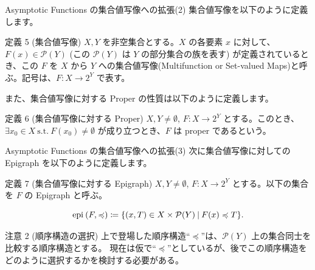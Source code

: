 \documentclass[aspectratio=169, dvipdfmx, 11pt]{beamer} %
\newcommand{\Epigraph}[1]{\text{epi\:${#1}$}} %
\newcommand{\SuchThat}{\:\text{s.t.}\:}
\newcommand{\SetForm}[2]{
  \{{#1}\:|\:{#2}\}
}
\begin{document}
\begin{frame}{Asymptotic Functions の集合値写像への拡張(2)}
  集合値写像を以下のように定義します。

  \begin{block}{定義 5 (集合値写像) \cite{ref1}}
    $X, Y$ を非空集合とする。$X$ の各要素 $x$ に対して、$F(x) \in \mathcal{P}(Y)$ (この $\mathcal{P}(Y)$ は $Y$ の部分集合の族を表す) が定義されているとき、この $F$ を $X$ から $Y$ への集合値写像(Multifunction or Set-valued Maps)と呼ぶ。記号は、$F: X \rightarrow 2^Y$ で表す。
  \end{block}

  また、集合値写像に対する Proper の性質は以下のように定義します。

  \begin{block}{定義 6 (集合値写像に対する Proper) \cite{ref2}}
    $X, Y \ne \emptyset$, $F: X \rightarrow 2^Y$ とする。このとき、$\exists x_0 \in X \SuchThat F(x_0) \ne \emptyset$ が成り立つとき、$F$ は proper であるという。
  \end{block}
\end{frame}

\begin{frame}{Asymptotic Functions の集合値写像への拡張(3)}
  次に集合値写像に対しての Epigraph を以下のように定義します。

  \begin{block}{定義 7 (集合値写像に対する Epigraph) \cite{ref1}}
    $X, Y \ne \emptyset$, $F: X \rightarrow 2^Y$ とする。以下の集合を $F$ の Epigraph と呼ぶ。

    \begin{equation}
      \Epigraph{(F, \preccurlyeq )} \coloneqq \SetForm{(x,T) \in X \times \mathcal{P}(Y)}{F(x) \preccurlyeq T}. \notag
    \end{equation}
  \end{block}

  \begin{alertblock}{注意 2 (順序構造の選択)}
    上で登場した順序構造``$\preccurlyeq$''は、$\mathcal{P}(Y)$ 上の集合同士を比較する順序構造とする。
    現在は仮で``$\preccurlyeq$''としているが、後でこの順序構造をどのように選択するかを検討する必要がある。
  \end{alertblock}
\end{frame}
\end{document}
